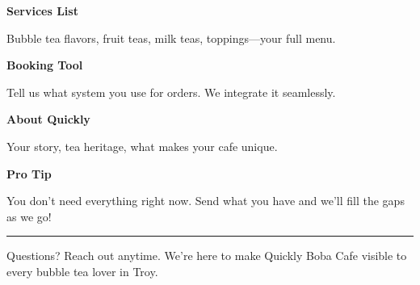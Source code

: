 \documentclass[11pt,letterpaper]{article}
\begin{document}
\begin{minipage}[t]{0.48\textwidth}
\begin{tcolorbox}[colframe=accent-teal, boxrule=1pt, left=0.7em, right=0.7em, top=0.5em, bottom=0.5em, arc=4pt, boxsep=0pt]
{\bfseries\small\color{accent-teal}Services List}

\vspace{0.15em}

{\small Bubble tea flavors, fruit teas, milk teas, toppings---your full menu.}
\end{tcolorbox}

\vspace{0.1em}

\begin{tcolorbox}[colframe=accent-teal, boxrule=1pt, left=0.7em, right=0.7em, top=0.5em, bottom=0.5em, arc=4pt, boxsep=0pt]
{\bfseries\small\color{accent-teal}Booking Tool}

\vspace{0.15em}

{\small Tell us what system you use for orders. We integrate it seamlessly.}
\end{tcolorbox}

\vspace{0.1em}

\begin{tcolorbox}[colframe=accent-teal, boxrule=1pt, left=0.7em, right=0.7em, top=0.5em, bottom=0.5em, arc=4pt, boxsep=0pt]
{\bfseries\small\color{accent-teal}About Quickly}

\vspace{0.15em}

{\small Your story, tea heritage, what makes your cafe unique.}
\end{tcolorbox}

\vspace{-0.2em}
\end{minipage}

\vspace{0.15em}

\begin{tcolorbox}[colback={accent-red!5}, colframe=accent-red!20, boxrule=0.5pt, left=0.7em, right=0.7em, top=0.4em, bottom=0.4em, arc=6pt, boxsep=0pt]

{\bfseries\small\color{accent-red}Pro Tip}

\vspace{0.1em}

{\small You don't need everything right now. Send what you have and we'll fill the gaps as we go!}

\end{tcolorbox}

\vspace{0.15em}

\noindent\hrule
\vspace{0.2em}

{\small\color{text-light}Questions? Reach out anytime. We're here to make Quickly Boba Cafe visible to every bubble tea lover in Troy.}
\end{document}

